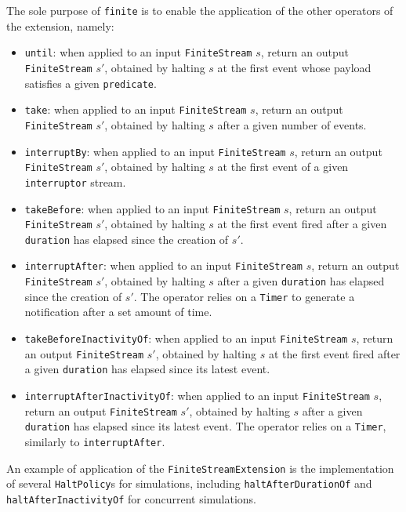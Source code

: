 The sole purpose of \texttt{finite} is to enable the application of the other
operators of the extension, namely:
\begin{itemize}
  \item \texttt{until}: when applied to an input \texttt{FiniteStream} $s$,
        return an output \texttt{Finite\-Stream} $s'$, obtained by halting $s$
        at the first event whose payload satisfies a given \texttt{predicate}.
  \item \texttt{take}: when applied to an input \texttt{FiniteStream} $s$,
        return an output \texttt{Finite\-Stream} $s'$, obtained by halting $s$
        after a given number of events.
  \item \texttt{interruptBy}: when applied to an input \texttt{FiniteStream}
        $s$, return an output \texttt{FiniteStream} $s'$, obtained by halting
        $s$ at the first event of a given \texttt{interruptor} stream.
  \item \texttt{takeBefore}: when applied to an input \texttt{FiniteStream}
        $s$, return an output \texttt{FiniteStream} $s'$, obtained by halting
        $s$ at the first event fired after a given \texttt{duration} has
        elapsed since the creation of $s'$.
  \item \texttt{interruptAfter}: when applied to an input \texttt{FiniteStream}
        $s$, return an output \texttt{FiniteStream} $s'$, obtained by halting
        $s$ after a given \texttt{duration} has elapsed since the creation of
        $s'$. The operator relies on a \texttt{Timer} to generate a
        notification after a set amount of time.
  \item \texttt{takeBeforeInactivityOf}: when applied to an input
        \texttt{FiniteStream} $s$, return an output \texttt{FiniteStream} $s'$,
        obtained by halting $s$ at the first event fired after a given
        \texttt{duration} has elapsed since its latest event.
  \item \texttt{interruptAfterInactivityOf}: when applied to an input
        \texttt{FiniteStream} $s$, return an output \texttt{FiniteStream} $s'$,
        obtained by halting $s$ after a given \texttt{duration} has elapsed
        since its latest event. The operator relies on a \texttt{Timer},
        similarly to \texttt{interruptAfter}.
\end{itemize}

An example of application of the \texttt{FiniteStreamExtension} is the
implementation of several \texttt{HaltPolicy}s for simulations, including
\texttt{haltAfterDurationOf} and \texttt{haltAfterInactivityOf} for concurrent
simulations.

